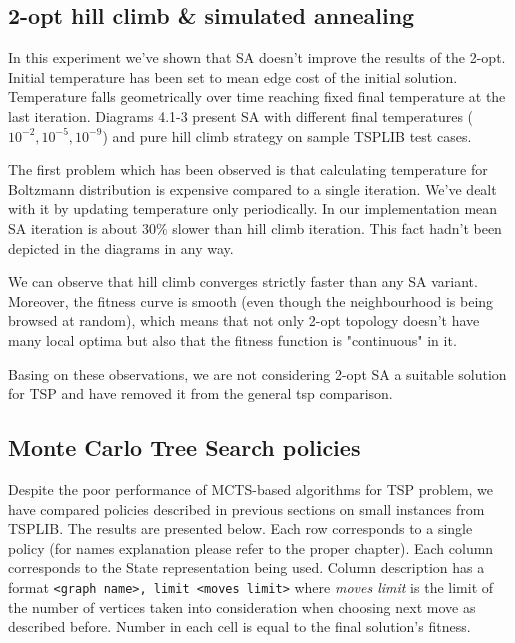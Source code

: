 \subsection { 2-opt hill climb \& simulated annealing }
In this experiment we've shown that SA doesn't improve the results of the 2-opt.
Initial temperature has been set to mean edge cost of the initial solution.
Temperature falls geometrically over time reaching fixed final temperature at the last iteration.
Diagrams 4.1-3 present SA with different final temperatures ($10^{-2}, 10^{-5}, 10^{-9}$) and
pure hill climb strategy on sample TSPLIB test cases.

\FloatBarrier
\begin{figure}[h]

\end{figure}
\begin{figure}[h]

\end{figure}
\begin{figure}[h]

\end{figure}
\FloatBarrier

The first problem which has been observed is that calculating temperature for Boltzmann distribution is
expensive compared to a single iteration. We've dealt with it by updating temperature
only periodically. In our implementation mean SA iteration is about $30\%$ slower than
hill climb iteration. This fact hadn't been depicted in the diagrams in any way.

We can observe that hill climb converges strictly faster than any SA variant.
Moreover, the fitness curve is smooth (even though the neighbourhood is being browsed at random),
which means that not only 2-opt topology doesn't have many local optima but also that the
fitness function is "continuous" in it.

Basing on these observations, we are not considering 2-opt SA a
suitable solution for TSP and have removed it from the general tsp comparison.

\subsection{Monte Carlo Tree Search policies}

Despite the poor performance of MCTS-based algorithms for TSP problem, we have
compared policies described in previous sections on small instances from
TSPLIB. The results are presented below. Each row corresponds to a single
policy (for names explanation please refer to the proper chapter). Each column
corresponds to the State representation being used. Column description has a
format \verb+<graph name>, limit <moves limit>+ where \emph{moves limit} is
the limit of the number of vertices taken into consideration when choosing next
move as described before. Number in each cell is equal to the final solution's
fitness.

